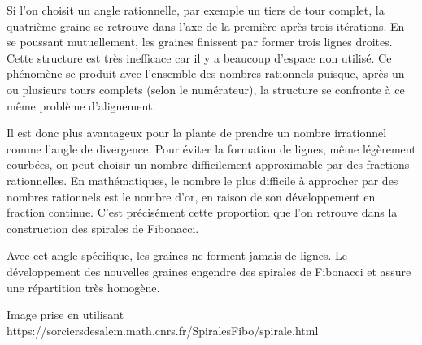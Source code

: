 Si l'on choisit un angle rationnelle, par exemple un tiers de tour complet, la quatrième graine se retrouve dans l'axe de la première après trois itérations. En se poussant mutuellement, les graines finissent par former trois lignes droites. Cette structure est très inefficace car il y a beaucoup d'espace non utilisé. Ce phénomène se produit avec l'ensemble des nombres rationnels puisque, après un ou plusieurs tours complets (selon le numérateur), la structure se confronte à ce même problème d'alignement.

Il est donc plus avantageux pour la plante de prendre un nombre irrationnel comme l'angle de divergence. Pour éviter la formation de lignes, même légèrement courbées, on peut  choisir un nombre difficilement approximable par des fractions rationnelles. En mathématiques, le nombre le plus difficile à approcher par des nombres rationnels est le nombre d'or, en raison de son développement en fraction continue. C'est précisément cette proportion que l'on retrouve dans la construction des spirales de Fibonacci.

Avec cet angle spécifique, les graines ne forment jamais de lignes. Le développement des nouvelles graines engendre des spirales de Fibonacci et assure une répartition très homogène.

Image prise en utilisant https://sorciersdesalem.math.cnrs.fr/SpiralesFibo/spirale.html